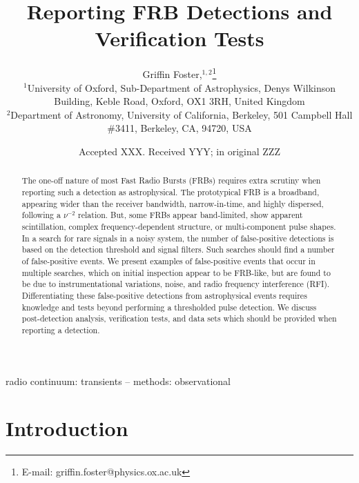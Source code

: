 \documentclass[a4paper,fleqn,usenatbib]{mnras}
\title[FRB Detections and Verification Tests]{Reporting FRB Detections
and Verification Tests}
\author[G. Foster et al.]{
Griffin Foster,$^{1,2}$\thanks{E-mail: griffin.foster@physics.ox.ac.uk}
\\
$^{1}$University of Oxford, Sub-Department of Astrophysics, Denys Wilkinson Building, Keble Road, Oxford, OX1 3RH, United Kingdom\\
$^{2}$Department of Astronomy, University of California, Berkeley, 501 Campbell
Hall \#3411, Berkeley, CA, 94720, USA\\
}
\date{Accepted XXX. Received YYY; in original ZZZ}
\begin{document}
\label{firstpage}
\pagerange{\pageref{firstpage}--\pageref{lastpage}}
\maketitle

\begin{abstract}
The one-off nature of most Fast Radio Bursts (FRBs) requires extra scrutiny when
reporting such a detection as astrophysical.  The prototypical FRB is a
broadband, appearing wider than the receiver bandwidth, narrow-in-time, and
highly dispersed, following a $\nu^{-2}$ relation.  But, some FRBs appear
band-limited, show apparent scintillation, complex frequency-dependent
structure, or multi-component pulse shapes.  In a search for rare signals in a
noisy system, the number of false-positive detections is based on the detection
threshold and signal filters.  Such searches should find a number of
false-positive events.  We present examples of false-positive events that occur
in multiple searches, which on initial inspection appear to be FRB-like, but are
found to be due to instrumentational variations, noise, and radio frequency
interference (RFI).  Differentiating these false-positive detections from
astrophysical events requires knowledge and tests beyond performing a
thresholded pulse detection.  We discuss post-detection analysis, verification
tests, and data sets which should be provided when reporting a detection.
\end{abstract}

\begin{keywords}
radio continuum: transients -- methods: observational
\end{keywords}


\section{Introduction}
\label{sec:intro}
\end{document}
